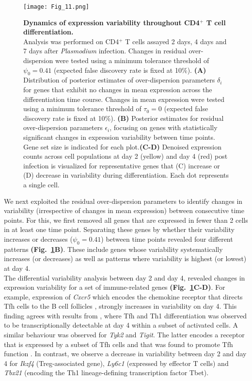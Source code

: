 \begin{figure}[!h]
\centering
\texttt{[image: Fig\_11.png]}
\caption{\textbf{Dynamics of expression variability throughout CD4$^+$ T cell differentiation.}\\
Analysis was performed on CD4$^+$ T cells assayed 2 days, 4 days and 7 days after \textit{Plasmodium} infection. Changes in residual over-dispersion were tested using a minimum tolerance threshold of $\psi_0=0.41$ (expected false discovery rate is fixed at 10\%). \textbf{(A)} Distribution of posterior estimates of over-dispersion parameters $\delta_i$ for genes that exhibit no changes in mean expression across the differentiation time course. Changes in mean expression were tested using a minimum tolerance threshold of $\tau_0=0$ (expected false discovery rate is fixed at 10\%). \textbf{(B)} Posterior estimates for residual over-dispersion parameters  $\epsilon_i$, focusing on genes with statistically significant changes in expression variability between time points. Gene set size is indicated for each plot.\textbf{(C-D)} Denoised expression counts across cell populations at day 2 (yellow) and day 4 (red) post infection is visualized for representative genes that (C) increase or (D) decrease in variability during differentiation. Each dot represents a single cell.\\}
\label{fig2:immune_differentiation}
\end{figure}

We next exploited the residual over-dispersion parameters to identify changes in variability (irrespective of changes in mean expression) between consecutive time points. For this, we first removed all genes that are expressed in fewer than 2 cells in at least one time point. Separating these genes by whether their variability increases or decreases ($\psi_0 = 0.41$) between time points revealed four different patterns \textbf{(Fig.~\ref{fig2:immune_differentiation}B)}. These include genes whose variability systematically increases (or decreases) as well as patterns where variability is highest (or lowest) at day 4. \\

The differential variability analysis between day 2 and day 4, revealed  changes in expression variability for a set of immune-related genes \textbf{(Fig.~\ref{fig2:immune_differentiation}C-D)}. For example, expression of \textit{Cxcr5} which encodes the chemokine receptor that directs Tfh cells to the B cell follicles \citep{Crotty2014}, strongly increases in variability on day 4. This finding agrees with results from \cite{Lonnberg2017}, where Tfh and Th1 differentiation was observed to be transcriptionally detectable at day 4 within a subset of activated cells. A similar behaviour was observed for \textit{Tyk2} and \textit{Tigit}. The latter encodes a receptor that is expressed by a subset of Tfh cells and that was found to promote Tfh function \citep{Godefroy2015}. In contrast, we observe a decrease in variability between day 2 and day 4 for \textit{Ikzf4} (Treg-associated gene), \textit{Ly6c1} (expressed by effector T cells) and \textit{Tbx21} (encoding the Th1 lineage-defining transcription factor Tbet). \\

